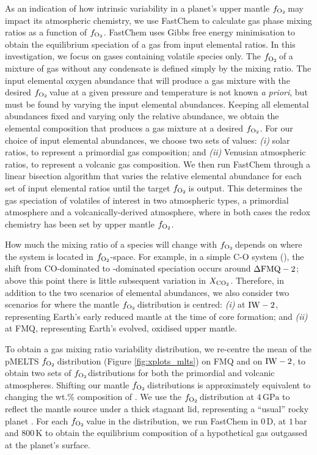 \documentclass[fleqn,usenatbib,twocolumn]{mnras}
\newcommand{\fo}{$f_{\ce{O2}}$}
\begin{document}
As an indication of how intrinsic variability in a planet's upper mantle \fo\,may impact its atmospheric chemistry, we use FastChem \citep{kitzmann_fastchem_2018, stock_fastchem_2022} to calculate gas phase mixing ratios as a function of \fo. FastChem uses Gibbs free energy minimisation to obtain the equilibrium speciation of a gas from input elemental ratios. In this investigation, we focus on gases containing volatile  species only. The \fo\,of a mixture of gas without any condensate is defined simply by the  mixing ratio. The input elemental oxygen abundance that will produce a  gas mixture with the desired \fo\,value at a given pressure and temperature is not known \textit{a priori}, but must be found by varying the input elemental abundances. Keeping all elemental abundances fixed and varying only the relative  abundance, we obtain the elemental composition that produces a gas mixture at a desired \fo. For our choice of input elemental abundances, we choose two sets of values: \textit{(i)} solar  ratios, to represent a primordial gas composition; and \textit{(ii)} Venusian atmospheric  ratios, to represent a volcanic gas composition. We then run FastChem through a linear bisection algorithm that varies the relative elemental  abundance for each set of input elemental ratios until the target \fo\,is output. This determines the gas speciation of volatiles of interest in two atmospheric types, a primordial atmosphere and a volcanically-derived atmosphere, where in both cases the redox chemistry has been set by upper mantle \fo. 

How much the mixing ratio of a species will change with \fo\,depends on where the system is located in \fo-space. For example, in a simple C-O system (), the shift from CO-dominated to -dominated speciation occurs around ${\rm \Delta FMQ} - 2$; above this point there is little subsequent variation in $X_{\ce{CO2}}$. Therefore, in addition to the two scenarios of elemental abundances, we also consider two scenarios for where the mantle \fo\,distribution is centred: \textit{(i)} at ${\rm IW} - 2$, representing Earth's early reduced mantle at the time of core formation; and \textit{(ii)} at FMQ, representing Earth's evolved, oxidised upper mantle. 

To obtain a gas mixing ratio variability distribution, we re-centre the mean of the pMELTS \fo\,distribution (Figure \ref{fig:xplots_mlts}) on FMQ and on ${\rm IW} - 2$, to obtain two sets of \fo distributions for both the primordial and volcanic atmospheres. Shifting our mantle \fo\,distributions is approximately equivalent to changing the wt.\% composition of . We use the \fo\,distribution at $4\,\text{GPa}$ to reflect the mantle source under a thick stagnant lid, representing a ``usual'' rocky planet \citep{stern_stagnant_2018}. For each \fo\,value in the distribution, we run FastChem in $0$\,D, at $1$\,bar and $800$\,K to obtain the equilibrium composition of a hypothetical gas outgassed at the planet's surface. 
\end{document}
